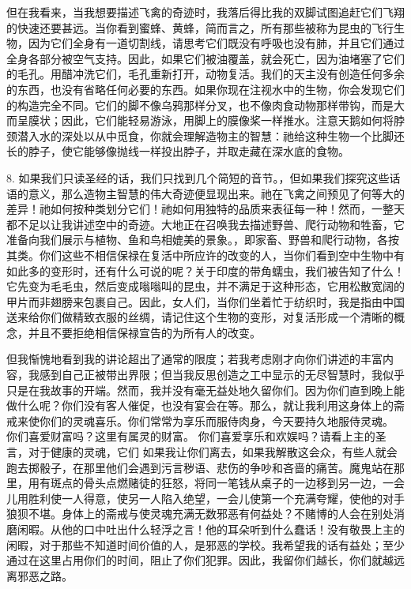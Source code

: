 但在我看来，当我想要描述飞禽的奇迹时，我落后得比我的双脚试图追赶它们飞翔的快速还要甚远。当你看到蜜蜂、黄蜂，简而言之，所有那些被称为昆虫的飞行生物，因为它们全身有一道切割线，请思考它们既没有呼吸也没有肺，并且它们通过全身各部分被空气支持。因此，如果它们被油覆盖，就会死亡，因为油堵塞了它们的毛孔。用醋冲洗它们，毛孔重新打开，动物复活。我们的天主没有创造任何多余的东西，也没有省略任何必要的东西。如果你现在注视水中的生物，你会发现它们的构造完全不同。它们的脚不像乌鸦那样分叉，也不像肉食动物那样带钩，而是大而呈膜状；因此，它们能轻易游泳，用脚上的膜像桨一样推水。注意天鹅如何将脖颈潜入水的深处以从中觅食，你就会理解造物主的智慧：祂给这种生物一个比脚还长的脖子，使它能够像抛线一样投出脖子，并取走藏在深水底的食物。\par

8. 如果我们只读圣经的话，我们只找到几个简短的音节。，但如果我们探究这些话语的意义，那么造物主智慧的伟大奇迹便显现出来。祂在飞禽之间预见了何等大的差异！祂如何按种类划分它们！祂如何用独特的品质来表征每一种！然而，一整天都不足以让我讲述空中的奇迹。大地正在召唤我去描述野兽、爬行动物和牲畜，它准备向我们展示与植物、鱼和鸟相媲美的景象。，即家畜、野兽和爬行动物，各按其类。你们这些不相信保禄在复活中所应许的改变的人，当你们看到空中生物中有如此多的变形时，还有什么可说的呢？关于印度的带角蠕虫，我们被告知了什么！它先变为毛毛虫，然后变成嗡嗡叫的昆虫，并不满足于这种形态，它用松散宽阔的甲片而非翅膀来包裹自己。因此，女人们，当你们坐着忙于纺织时，我是指由中国送来给你们做精致衣服的丝绸，请记住这个生物的变形，对复活形成一个清晰的概念，并且不要拒绝相信保禄宣告的为所有人的改变。\par

但我惭愧地看到我的讲论超出了通常的限度；若我考虑刚才向你们讲述的丰富内容，我感到自己正被带出界限；但当我反思创造之工中显示的无尽智慧时，我似乎只是在我故事的开端。然而，我并没有毫无益处地久留你们。因为你们直到晚上能做什么呢？你们没有客人催促，也没有宴会在等。那么，就让我利用这身体上的斋戒来使你们的灵魂喜乐。你们常常为享乐而服侍肉身，今天要持久地服侍灵魂。 你们喜爱财富吗？这里有属灵的财富。 你们喜爱享乐和欢娱吗？请看上主的圣言，对于健康的灵魂，它们 如果我让你们离去，如果我解散这会众，有些人就会跑去掷骰子，在那里他们会遇到污言秽语、悲伤的争吵和吝啬的痛苦。魔鬼站在那里，用有斑点的骨头点燃赌徒的狂怒，将同一笔钱从桌子的一边移到另一边，一会儿用胜利使一人得意，使另一人陷入绝望，一会儿使第一个充满夸耀，使他的对手狼狈不堪。身体上的斋戒与使灵魂充满无数邪恶有何益处？不赌博的人会在别处消磨闲暇。从他的口中吐出什么轻浮之言！他的耳朵听到什么蠢话！没有敬畏上主的闲暇，对于那些不知道时间价值的人，是邪恶的学校。我希望我的话有益处；至少通过在这里占用你们的时间，阻止了你们犯罪。因此，我留你们越长，你们就越远离邪恶之路。\par


